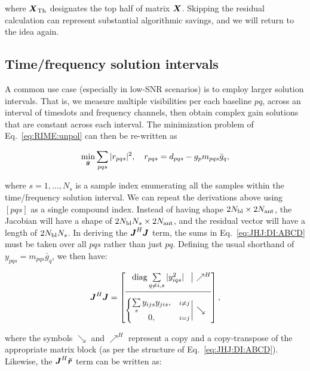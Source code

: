 \documentclass[useAMS,usenatbib]{mn2e}
\newcommand{\mat}[1]{{\bmath{#1}}}
\newcommand{\JJ}{\mat{J}} %
\newcommand{\JHJ}{\JJ^H\JJ} %
\begin{document}
where $\bmath{X}_\TOP$ designates the top half of matrix $\bmath{X}$. Skipping the residual calculation can represent substantial algorithmic savings, and we will return to the idea again.


\subsection{Time/frequency solution intervals}
\label{sec:unpol:DI:avg}
\label{sec:solution-intervals}

\newcommand{\Ns}{N_s}

A common use case (especially in low-SNR scenarios) is to employ larger solution intervals. 
That is, we measure multiple visibilities per each baseline $pq$, across an interval of timeslots and
frequency channels, then obtain complex gain solutions that are constant across each interval. The 
minimization problem of Eq.~\ref{eq:RIME:unpol} can then be re-written as

\begin{equation}
\label{eq:cal:DI:tf}
\min_{\bmath{g}}\sum_{pqs}|r_{pqs}|^2, 
~~~r_{pqs} = d_{pqs}-g_p m_{pqs} \bar{g}_q, 
\end{equation}

where $s=1,...,N_s$ is a sample index enumerating all the samples within the 
time/frequency solution interval. We can repeat the derivations above using  $[pqs]$ as a
single compound index. Instead of having shape $2N_\mathrm{bl}\times2N_\mathrm{ant}$, the Jacobian 
will have a shape of $2\Nbl\Ns\times 2\Na$, and the residual vector will have a length of 
$2\Nbl\Ns$. In deriving the $\JHJ$ term, the sums in Eq.~\ref{eq:JHJ:DI:ABCD} must be taken over all $pqs$ 
rather than just $pq$. Defining the usual shorthand of 
$y_{pqs}=m_{pqs}\bar{g}_q$, we then have:

\begin{equation}
\label{eq:JHJ:DI:tf}
\JJ^H \JJ = 
\JHJblocks{
  \mathrm{diag} \sum\limits_{q\ne i,s} |y^2_{iqs}| 
}{
  \left \{ 
  \begin{array}{@{}cc@{}}
   \sum\limits_{s} y_{ijs}y_{jis},&{\scriptstyle i\ne j} \\
   0, &{\scriptstyle i=j}
  \end{array} \right . 
},
\end{equation}

where the symbols $\searrow$ and $\nearrow^H$ represent a copy and a copy-transpose of the appropriate matrix block (as per the structure of Eq.~\ref{eq:JHJ:DI:ABCD}). Likewise, the $\JJ^H\Rr$ term can be written as:
\end{document}
